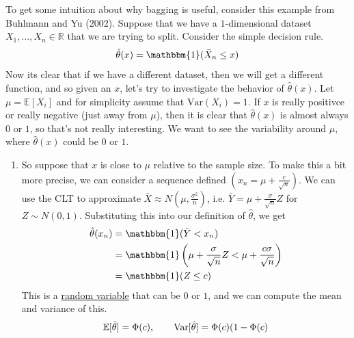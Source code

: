   \begin{example}
    \label{ex:theory-of-bagging-on-toy-dataset}
    To get some intuition about why bagging is useful, consider this example from Buhlmann and Yu (2002). Suppose that we have a $1$-dimensional dataset $X_1, \ldots, X_n \in \mathbb{R}$ that we are trying to split. Consider the simple decision rule. 
    \begin{equation}
      \hat{\theta} (x) = \mathbbm{1}(\bar{X}_n \leq x)
    \end{equation}
    Now its clear that if we have a different dataset, then we will get a different function, and so given an $x$, let's try to investigate the behavior of $\hat{\theta}(x)$. Let $\mu = \mathbb{E}[X_i]$ and for simplicity assume that $\text{Var}(X_i) = 1$. If $x$ is really positivce or really negative (just away from $\mu$), then it is clear that $\hat{\theta}(x)$ is almost always $0$ or $1$, so that's not really interesting. We want to see the variability around $\mu$, where $\hat{\theta}(x)$ could be $0$ or $1$. 
    \begin{enumerate}
      \item So suppose that $x$ is close to $\mu$ relative to the sample size. To make this a bit more precise, we can consider a sequence defined $(x_n = \mu + \frac{c}{\sqrt{n}})$. We can use the CLT to approximate $\bar{X} \approx N(\mu, \frac{\sigma^2}{n})$, i.e. $\bar{Y} = \mu + \frac{\sigma}{\sqrt{n}} Z$ for $Z \sim N(0, 1)$. Substituting this into our definition of $\hat{\theta}$, we get 
      \begin{align}
        \hat{\theta}(x_n) & = \mathbbm{1}(\bar{Y} < x_n) \\ 
                          & = \mathbbm{1} \left( \mu + \frac{\sigma}{\sqrt{n}} Z < \mu + \frac{c \sigma}{\sqrt{n}} \right) \\ 
                          & = \mathbbm{1}(Z \leq c)
      \end{align}
      This is a \hyperref[prob-def:random-variable]{random variable} that can be $0$ or $1$, and we can compute the mean and variance of this. 
      \begin{equation}
        \mathbb{E}[\hat{\theta}] = \Phi(c), \qquad \operatorname{Var}[\hat{\theta}] = \Phi(c) (1 - \Phi(c)
      \end{equation}


\end{enumerate}
\end{example}
